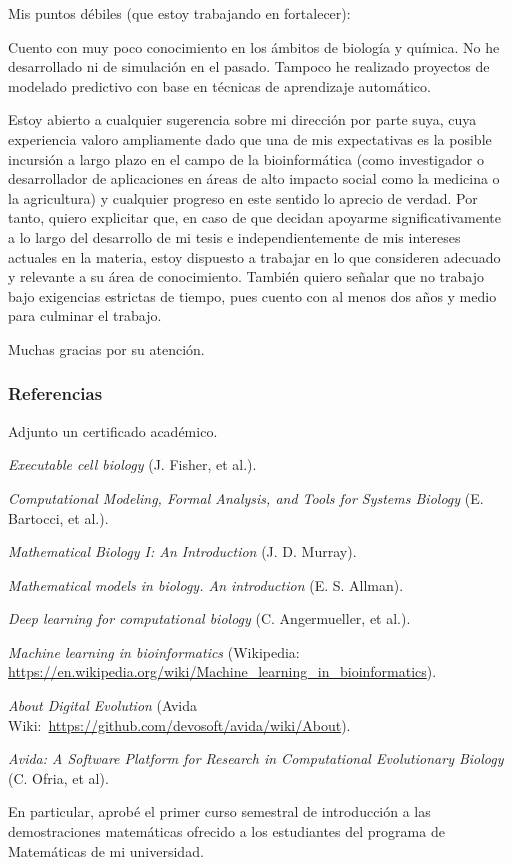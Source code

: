\documentclass[12pt]{article}
\begin{document}
	Mis puntos débiles (que estoy trabajando en fortalecer):

	Cuento con muy poco conocimiento en los ámbitos de biología y química.
	No he desarrollado  ni de simulación en
	el pasado. Tampoco he realizado proyectos de modelado predictivo con
	base en técnicas de aprendizaje automático.

	Estoy abierto a cualquier sugerencia sobre mi dirección por parte suya,
	cuya experiencia valoro ampliamente dado que una de mis expectativas es
	la posible incursión a largo plazo en el campo de la bioinformática
	(como investigador o desarrollador de aplicaciones en áreas de alto
	impacto social como la medicina o la agricultura) y cualquier progreso
	en este sentido lo aprecio de verdad. Por tanto, quiero explicitar que,
	en caso de que decidan apoyarme significativamente a lo largo del
	desarrollo de mi tesis e independientemente de mis intereses actuales en
	la materia, estoy dispuesto a trabajar en lo que consideren adecuado y
	relevante a su área de conocimiento. También quiero señalar que no
	trabajo bajo exigencias estrictas de tiempo, pues cuento con al menos
	dos años y medio para culminar el trabajo.

	Muchas gracias por su atención.

	\subsubsection*{Referencias}

	\begin{enumerate}[label={[\arabic*]}]
	\item Adjunto un certificado académico.
	\item \textit{Executable cell biology} (J. Fisher, et al.).
	\item \textit{Computational Modeling, Formal Analysis, and Tools for
		Systems Biology} (E. Bartocci, et al.).
	\item \textit{Mathematical Biology I: An Introduction} (J. D. Murray).
	\item \textit{Mathematical models in biology. An introduction}
		(E. S. Allman).
	\item \textit{Deep learning for computational biology}
		(C. Angermueller, et al.).
	\item \textit{Machine learning in bioinformatics} (Wikipedia:
	\url{https://en.wikipedia.org/wiki/Machine_learning_in_bioinformatics}).
\item \textit{About Digital Evolution} (Avida Wiki:\ 
	\url{https://github.com/devosoft/avida/wiki/About}).
	\item \textit{Avida: A Software Platform for Research in Computational
		Evolutionary Biology} (C. Ofria, et al).
	\item En particular, aprobé el primer curso semestral de introducción a
		las demostraciones matemáticas ofrecido a los estudiantes del
		programa de Matemáticas de mi universidad.
	\end{enumerate}
\end{document}

